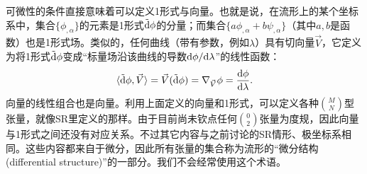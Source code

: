 可微性的条件直接意味着可以定义1形式与向量。也就是说，在流形上的某个坐标系中，集合$\{ \phi_{, \alpha} \}$的元素是1形式$\tilde{\mathrm{d}} \phi$的分量；而集合$\{ a \phi_{, \alpha} + b \psi_{, \alpha} \}$（其中$a, b$是函数）也是1形式场。类似的，任何曲线（带有参数，例如$\lambda$）具有切向量$\vec{V}$，它定义为将1形式$\tilde{\mathrm{d}} \phi$变成“标量场沿该曲线的导数$\mathrm{d} \phi / \mathrm{d} \lambda$”的线性函数：
\begin{equation}
    \langle \tilde{\mathrm{d}} \phi, \vec{V} \rangle = \vec{V} (\tilde{\mathrm{d}} \phi) = \nabla_{\vec{V}} \phi = \frac{\mathrm{d} \phi}{\mathrm{d} \lambda}.
\label{equ6.1}
\end{equation}
向量的线性组合也是向量。利用上面定义的向量和1形式，可以定义各种$\binom{M}{N}$型张量，就像SR里定义的那样。由于目前尚未钦点任何$\binom{0}{2}$张量为度规，因此向量与1形式之间还没有对应关系。不过其它内容与之前讨论的SR情形、极坐标系相同。这些内容都来自于微分，因此所有张量的集合称为流形的“微分结构 (differential structure)”的一部分。我们不会经常使用这个术语。


